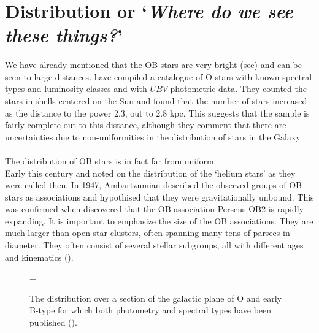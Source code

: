 
\section{Distribution or `\emph{Where do we see these things?}'}


\paragraph{}
We have already mentioned that the OB stars are very bright
(see) 
and can be seen to large distances.  have compiled
a catalogue of O stars with known spectral types and luminosity classes and 
with $UBV$ photometric data. They counted the stars in shells
centered on the
Sun and found that the number of stars increased as the distance to
the power 2.3, out to 2.8 kpc. This suggests that the sample is fairly
complete out to this distance, although they comment that there are
uncertainties due to non-uniformities in the  distribution of stars in
the Galaxy.

\paragraph{}
The distribution of OB stars is in fact far from uniform. \\  Early this
century  and  noted on the
distribution of the `helium stars' as they were called then. 
In 1947, Ambartzumian \nocite{am:evolution} described the
observed groups of OB stars as associations and hypothised that they were
gravitationally unbound. This was confirmed when 
discovered that the OB association Perseus OB2 is rapidly expanding. It is
important to emphasize the size of the OB associations. They are much
larger than open star clusters, often spanning many tens of parsecs in
diameter. They often consist of several stellar subgroups, all
with different ages and kinematics (\cite{ga:OBreview}).

\begin{figure}
  \label{fig:OBdist}
  \epsfxsize=\figwidth
  \caption{The distribution over a section of the galactic plane 
	of O and early B-type for which both
	photometry and spectral types have been published
	(\protect\cite{ga:OBreview}).}
\end{figure}

